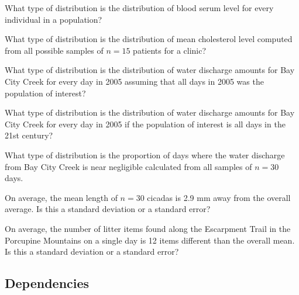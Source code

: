 \documentclass[10pt,openany]{book}\usepackage[]{graphicx}\usepackage[]{color}
\begin{document}
\vspace{-12pt}

\vspace{-12pt}


\begin{exsection}
  \item \label{revex:SamplingDistBS} What type of distribution is the distribution of blood serum level for every individual in a population? 
  \item \label{revex:SamplingDistCL} What type of distribution is the distribution of mean cholesterol level computed from all possible samples of $n=15$ patients for a clinic?  
  \item \label{revex:SamplingDistWD1} What type of distribution is the distribution of water discharge amounts for Bay City Creek for every day in 2005 assuming that all days in 2005 was the population of interest? 
  \item \label{revex:SamplingDistWD2} What type of distribution is the distribution of water discharge amounts for Bay City Creek for every day in 2005 if the population of interest is all days in the 21st century? 
  \item \label{revex:SamplingDistWD3} What type of distribution is the proportion of days where the water discharge from Bay City Creek is near negligible calculated from all samples of $n=30$ days. 
  \item \label{revex:SamplingDistC} On average, the mean length of $n=30$ cicadas is 2.9 mm away from the overall average.  Is this a standard deviation or a standard error? 
  \item \label{revex:SamplingDistET} On average, the number of litter items found along the Escarpment Trail in the Porcupine Mountains on a single day is 12 items different than the overall mean.  Is this a standard deviation or a standard error? 
\end{exsection}


\subsection{Dependencies}
\end{document}
